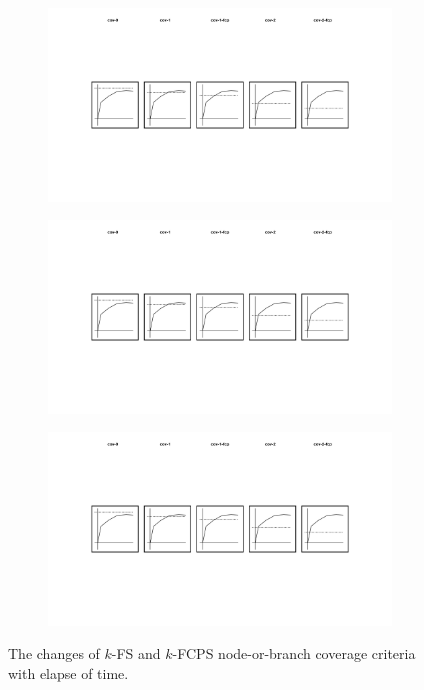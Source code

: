 \begin{figure}
\begin{subfigure}{0.19\textwidth}
  \end{subfigure}
  \begin{subfigure}{0.19\textwidth}
    \centering
    \includegraphics[width=\textwidth]{img/cov-1-fcp}
  \end{subfigure}
  \begin{subfigure}{0.19\textwidth}
    \centering
    \includegraphics[width=\textwidth]{img/cov-2}
  \end{subfigure}
  \begin{subfigure}{0.19\textwidth}
    \centering
    \includegraphics[width=\textwidth]{img/cov-2-fcp}
  \end{subfigure}
  \caption{
    The changes of $k$-FS and $k$-FCPS node-or-branch coverage criteria with
    elapse of time.
  }
  \label{fig:cov-time}
\end{figure}


